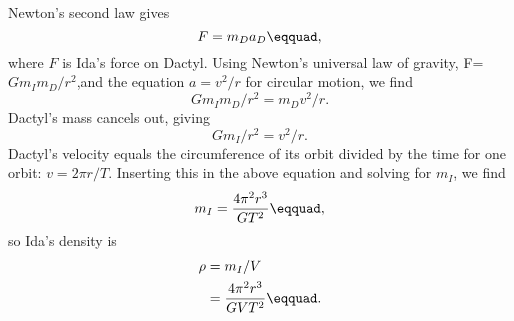 Newton's second law gives
\begin{equation*}
        F  =  m_D a_D\eqquad,
\end{equation*}
where $F$ is Ida's force on Dactyl. Using Newton's universal
law of gravity, F= $Gm_I m_D/r^2$,and the equation 
$a=v^2/r$ for circular motion, we find
\begin{equation*}
        Gm_I m_D/ r ^2 =  m_Dv ^2/ r   .
\end{equation*}
Dactyl's mass cancels out, giving
\begin{equation*}
        Gm_I/ r ^2 =  v ^2/ r   .
\end{equation*}
Dactyl's velocity equals the circumference of its orbit
divided by the time for one orbit: $v=2\pi r/T$. Inserting
this in the above equation and solving for $m_I$, we find
\begin{equation*}
        m_I     =  \frac{4\pi^2r^3}{GT^2}\eqquad,
\end{equation*}
so Ida's density is
\begin{align*}
        \rho      &=  m_I/ V  \\
                  &=  \frac{4\pi^2r^3}{GVT^2}\eqquad.
\end{align*}



